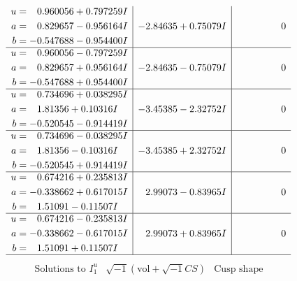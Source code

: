 \documentclass[1p]{elsarticle_modified}
\theoremstyle{definition}
\newcommand{\I}{\sqrt{-1}}
\begin{document}
$$\begin{array}{c|c|c}
\begin{aligned}
u &= \phantom{-}0.960056 + 0.797259 I \\
a &= \phantom{-}0.829657 - 0.956164 I \\
b &= -0.547688 - 0.954400 I\end{aligned}
 & -2.84635 + 0.75079 I & \phantom{-0.000000 } 0 \\ \hline\begin{aligned}
u &= \phantom{-}0.960056 - 0.797259 I \\
a &= \phantom{-}0.829657 + 0.956164 I \\
b &= -0.547688 + 0.954400 I\end{aligned}
 & -2.84635 - 0.75079 I & \phantom{-0.000000 } 0 \\ \hline\begin{aligned}
u &= \phantom{-}0.734696 + 0.038295 I \\
a &= \phantom{-}1.81356 + 0.10316 I \\
b &= -0.520545 - 0.914419 I\end{aligned}
 & -3.45385 - 2.32752 I & \phantom{-0.000000 } 0 \\ \hline\begin{aligned}
u &= \phantom{-}0.734696 - 0.038295 I \\
a &= \phantom{-}1.81356 - 0.10316 I \\
b &= -0.520545 + 0.914419 I\end{aligned}
 & -3.45385 + 2.32752 I & \phantom{-0.000000 } 0 \\ \hline\begin{aligned}
u &= \phantom{-}0.674216 + 0.235813 I \\
a &= -0.338662 + 0.617015 I \\
b &= \phantom{-}1.51091 - 0.11507 I\end{aligned}
 & \phantom{-}2.99073 - 0.83965 I & \phantom{-0.000000 } 0 \\ \hline\begin{aligned}
u &= \phantom{-}0.674216 - 0.235813 I \\
a &= -0.338662 - 0.617015 I \\
b &= \phantom{-}1.51091 + 0.11507 I\end{aligned}
 & \phantom{-}2.99073 + 0.83965 I & \phantom{-0.000000 } 0\\
 \hline 
 \end{array}$$\newpage$$\begin{array}{c|c|c}  
\text{Solutions to }I^u_{1}& \I (\text{vol} + \sqrt{-1}CS) & \text{Cusp shape}\\
 \hline 
\begin{aligned}

\end{aligned}
\end{array}$$
\end{document}
